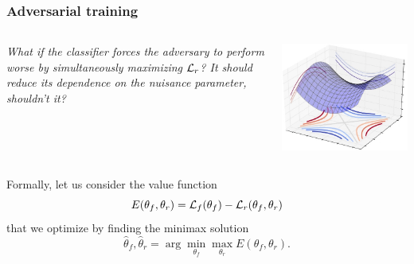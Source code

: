 \documentclass{beamer}
\begin{document}
\begin{frame}
    \frametitle{Adversarial training}

    \begin{columns}
        \begin{column}{0.7\textwidth}
            {\it
            What if the classifier forces the adversary to perform worse by simultaneously maximizing ${\cal L}_r$?
            It should reduce its dependence on the nuisance parameter, shouldn't it?}
        \end{column}
        \begin{column}{0.3\textwidth}
            \begin{center}
                \includegraphics[width=\textwidth]{figures/saddle.jpg}
            \end{center}
        \end{column}
    \end{columns}

    \vspace{0.5cm}

    Formally, let us consider the value function
    $$E(\theta_f, \theta_r) = {\cal L}_f(\theta_f) - {\cal L}_r(\theta_f, \theta_r)$$
    that we optimize by finding the minimax solution
    $$\hat\theta_f, \hat\theta_r = \arg \min_{\theta_f} \max_{\theta_r} E(\theta_f, \theta_r).$$

\end{frame}
\end{document}
